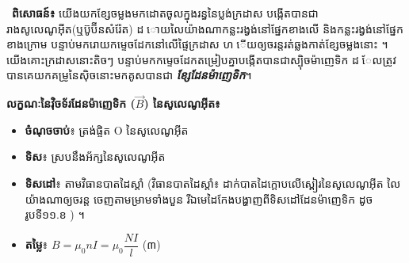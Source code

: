 \noindent
\begin{minipage}[t]{0.55\textwidth}
	\raggedright
	\faChevronRight\ \textcolor{brownheader}{\textbf{ពិសោធន៍៖ }}
	យើងយកខ្សែចម្លងមកដោតចូលក្នុងរន្ធនៃប្លង់ក្រដាស បង្កើតបានជារាងសូលេណូអ៊ីត(ឬប៊ូប៊ីនសំរ៉ែត) ដ ោយលៃយ៉ាងណាកន្លះរង្វង់នៅផ្នែកខាងលើ និងកន្លះរង្វង់នៅផ្នែកខាងក្រោម បន្ទាប់មករោយកម្ទេចដែកនៅលើផ្ទៃក្រដាស ហ ើយឲ្យចរន្តរត់ឆ្លងកាត់ខ្សែចម្លងនោះ ។ យើងគោះក្រដាសនោះតិចៗ បន្ទាប់មកកម្ទេចដែកតម្រៀបគ្នាបង្កើតបានជាស្បុិចម៉ាញេទិក ដ ែលត្រូវបានគេយកគម្រូនៃស៊ិចនោះមកគូសបានជា \textbf{\textit{ខ្សែដែនម៉ាញេទិក}}។
	
\end{minipage}%
\hfill
\begin{minipage}[t]{0.40\textwidth}
	\vspace{0pt}
	\hspace*{0.5em}%
\end{minipage}

\vspace{1em}
\noindent
\begin{minipage}[t]{0.55\textwidth}
	\raggedright
	\textbf{លក្ខណៈនៃវ៉ិចទ័រដែនម៉ាញេទិក ($\vec{B}$) នៃសូលេណូអុីត៖}

	\vspace{0.5em}
	\begin{itemize}[itemsep=4pt, topsep=2pt, parsep=0pt, leftmargin=1.6em]
	\item \textbf{ចំណុចចាប់}៖ ត្រង់ផ្ចិត O នៃសូលេណូអុីត
	\item \textbf{ទិស}៖ ស្របនឹងអ័ក្សនៃសូលេណូអុីត
	\item \textbf{ទិសដៅ}៖ តាមវិធានបាតដៃស្តាំ (វិធានបាតដៃស្តាំ៖
	ដាក់បាតដៃក្តោបលើ\mbox{ស្ពៀរ}នៃសូលេណូអុីត
	លៃយ៉ាងណាឲ្យចរន្ត ចេញតាមម្រាមទាំងបួន រីឯមេដៃកែងបង្ហាញពីទិសដៅដែនម៉ាញេទិក ដូចរូបទី១១.ខ ) ។
	\item \textbf{តម្លៃ}៖ $B = \mu_0 n I = \mu_0 \dfrac{NI}{l}$ \quad (៣)
\end{itemize}
	\vspace{0.5em}
\end{minipage}%
\hfill
\begin{minipage}[t]{0.40\textwidth}
	\vspace{0pt}
	\hspace*{0.5em}%
\end{minipage}

